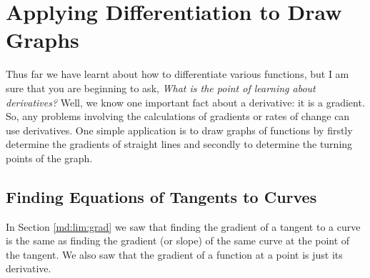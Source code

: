 
\section{Applying Differentiation to Draw Graphs}
\label{md:graphs}

Thus far we have learnt about how to differentiate various functions, but I am sure that you are beginning to ask, \textit{What is the point of learning about derivatives?} Well, we know one important fact about a derivative: it is a gradient. So, any problems involving the calculations of gradients or rates of change can use derivatives. One simple application is to draw graphs of functions by firstly determine the gradients of straight lines and secondly to determine the turning points of the graph.

\subsection{Finding Equations of Tangents to Curves}
\label{md:graphs:tan}
In Section \ref{md:lim:grad} we saw that finding the gradient of a tangent to a curve is the same as finding the gradient (or slope) of the same curve at the point of the tangent. We also saw that the gradient of a function at a point is just its derivative.

